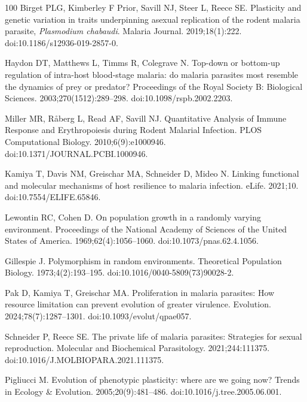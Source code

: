 \documentclass[10pt,letterpaper]{article}
\begin{document}
\begin{thebibliography}{100}
Birget PLG, {Kimberley F  Prior}, Savill NJ, Steer L, Reece SE.
\newblock Plasticity and genetic variation in traits underpinning asexual replication of the rodent malaria parasite, \textit{{Plasmodium} chabaudi}.
\newblock Malaria Journal. 2019;18(1):222.
\newblock doi:{10.1186/s12936-019-2857-0}.

Haydon DT, Matthews L, Timms R, Colegrave N.
\newblock Top-down or bottom-up regulation of intra-host blood-stage malaria: do malaria parasites most resemble the dynamics of prey or predator?
\newblock Proceedings of the Royal Society B: Biological Sciences. 2003;270(1512):289--298.
\newblock doi:{10.1098/rspb.2002.2203}.

Miller MR, Råberg L, Read AF, Savill NJ.
\newblock Quantitative {Analysis} of {Immune} {Response} and {Erythropoiesis} during {Rodent} {Malarial} {Infection}.
\newblock PLOS Computational Biology. 2010;6(9):e1000946.
\newblock doi:{10.1371/JOURNAL.PCBI.1000946}.

Kamiya T, Davis NM, Greischar MA, Schneider D, Mideo N.
\newblock Linking functional and molecular mechanisms of host resilience to malaria infection.
\newblock eLife. 2021;10.
\newblock doi:{10.7554/ELIFE.65846}.

Lewontin RC, Cohen D.
\newblock On population growth in a randomly varying environment.
\newblock Proceedings of the National Academy of Sciences of the United States of America. 1969;62(4):1056--1060.
\newblock doi:{10.1073/pnas.62.4.1056}.

Gillespie J.
\newblock Polymorphism in random environments.
\newblock Theoretical Population Biology. 1973;4(2):193--195.
\newblock doi:{10.1016/0040-5809(73)90028-2}.

Pak D, Kamiya T, Greischar MA.
\newblock Proliferation in malaria parasites: {How} resource limitation can prevent evolution of greater virulence.
\newblock Evolution. 2024;78(7):1287--1301.
\newblock doi:{10.1093/evolut/qpae057}.

Schneider P, Reece SE.
\newblock The private life of malaria parasites: {Strategies} for sexual reproduction.
\newblock Molecular and Biochemical Parasitology. 2021;244:111375.
\newblock doi:{10.1016/J.MOLBIOPARA.2021.111375}.

Pigliucci M.
\newblock Evolution of phenotypic plasticity: where are we going now?
\newblock Trends in Ecology \& Evolution. 2005;20(9):481--486.
\newblock doi:{10.1016/j.tree.2005.06.001}.


\end{thebibliography}
\end{document}
